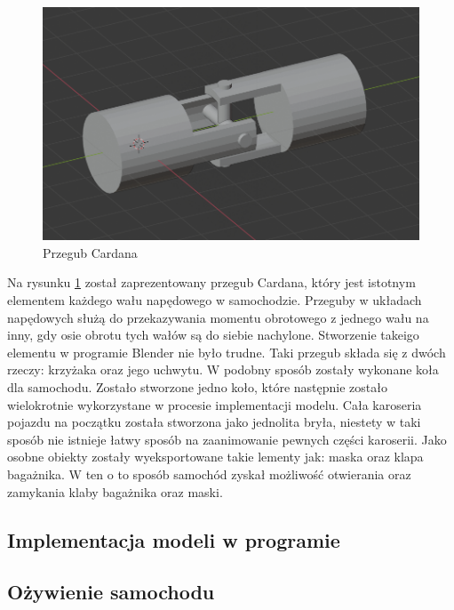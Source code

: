 \documentclass[a4paper,12pt]{article}
\numberwithin{equation}{section}
\begin{document}
\begin{figure}[h!]
    \centering
    \includegraphics[width=\textwidth]{joint.png}
    \caption{Przegub Cardana}
    \label{fig:joint}
\end{figure}

 Na rysunku \ref{fig:joint} został zaprezentowany przegub Cardana, który jest istotnym elementem każdego wału napędowego w samochodzie. Przeguby w układach napędowych służą do przekazywania momentu obrotowego z jednego wału na inny, gdy osie obrotu tych wałów są do siebie nachylone. Stworzenie takeigo elementu w programie Blender nie było trudne. Taki przegub składa się z dwóch rzeczy: krzyżaka oraz jego uchwytu.
 \newline
 \indent W podobny sposób zostały wykonane koła dla samochodu. Zostało stworzone jedno koło, które następnie zostało wielokrotnie wykorzystane w procesie implementacji modelu. 
 \newline
 \indent Cała karoseria pojazdu na początku została stworzona jako jednolita bryła, niestety w taki sposób nie istnieje łatwy sposób na zaanimowanie pewnych części karoserii. Jako osobne obiekty zostały wyeksportowane takie lementy jak: maska oraz klapa bagażnika. W ten o to sposób samochód zyskał możliwość otwierania oraz zamykania klaby bagażnika oraz maski. 


\subsection{Implementacja modeli w programie}
\subsection{Ożywienie samochodu}
\end{document}
